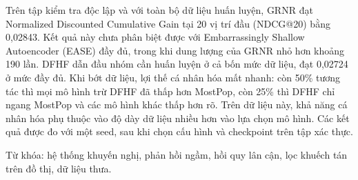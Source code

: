 \documentclass[12pt,a4paper]{article}
\theoremstyle{plain} %
\theoremstyle{plain} %
\theoremstyle{plain} %
\theoremstyle{nonumberplain}  %
\numberwithin{equation}{section}
\numberwithin{figure}{section}
\numberwithin{table}{section}
\begin{document}
Trên tập kiểm tra độc lập và với toàn bộ dữ liệu huấn luyện, GRNR đạt Normalized Discounted Cumulative Gain tại 20 vị trí đầu (NDCG@20) bằng 0,02843. Kết quả này chưa phân biệt được với Embarrassingly Shallow Autoencoder (EASE) đầy đủ, trong khi dung lượng của GRNR nhỏ hơn khoảng 190 lần. DFHF dẫn đầu nhóm cần huấn luyện ở cả bốn mức dữ liệu, đạt 0,02724 ở mức đầy đủ. Khi bớt dữ liệu, lợi thế cá nhân hóa mất nhanh: còn 50\% tương tác thì mọi mô hình trừ DFHF đã thấp hơn MostPop, còn 25\% thì DFHF chỉ ngang MostPop và các mô hình khác thấp hơn rõ. Trên dữ liệu này, khả năng cá nhân hóa phụ thuộc vào độ dày dữ liệu nhiều hơn vào lựa chọn mô hình. Các kết quả được đo với một seed, sau khi chọn cấu hình và checkpoint trên tập xác thực.

\medskip
\noindent Từ khóa: hệ thống khuyến nghị, phản hồi ngầm, hồi quy lân cận, lọc khuếch tán trên đồ thị, dữ liệu thưa.

\clearpage


\clearpage

\clearpage

\clearpage

\clearpage

\clearpage

\clearpage
{}
{}

\end{document}
